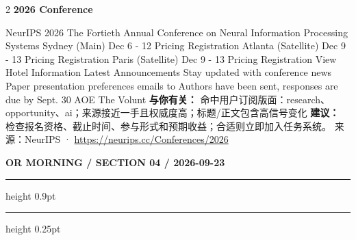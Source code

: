 \documentclass[10.5pt]{ctexart}
\begin{document}
\begin{multicols}{2}
{\large\bfseries 2026 Conference}\par
NeurIPS 2026 The Fortieth Annual Conference on Neural Information Processing Systems Sydney (Main) Dec 6 - 12 Pricing Registration Atlanta (Satellite) Dec 9 - 13 Pricing Registration Paris (Satellite) Dec 9 - 13 Pricing Registration View Hotel Information Latest Announcements Stay updated with conference news Paper presentation preferences emails to Authors have been sent, responses are due by Sept. 30 AOE The Volunt
\textbf{与你有关：} 命中用户订阅版面：research、opportunity、ai；来源接近一手且权威度高；标题/正文包含高信号变化
\textbf{建议：} 检查报名资格、截止时间、参与形式和预期收益；合适则立即加入任务系统。
{\footnotesize\color{ormuted} 来源：NeurIPS · \url{https://neurips.cc/Conferences/2026}}
\end{multicols}
\newpage
{\small\bfseries OR MORNING / SECTION 04 / 2026-09-23}
\vspace{2mm}
\hrule height 0.9pt
\vspace{1.5mm}
\hrule height 0.25pt
\vspace{4mm}
\end{document}

